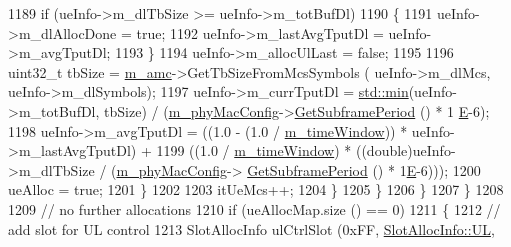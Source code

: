 \begin{DoxyCode}
1189                                                 \textcolor{keywordflow}{if} (ueInfo->m\_dlTbSize >= ueInfo->m\_totBufDl)
1190                                                 \{
1191                                                         ueInfo->m\_dlAllocDone = \textcolor{keyword}{true};
1192                                                         ueInfo->m\_lastAvgTputDl = ueInfo->m\_avgTputDl;
1193                                                 \}
1194                                                 ueInfo->m\_allocUlLast = \textcolor{keyword}{false};
1195 
1196                                                 uint32\_t tbSize = \hyperlink{classns3_1_1MmWaveFlexTtiMaxRateMacScheduler_a8a84d69426586fddd45abe7174da607d}{m\_amc}->GetTbSizeFromMcsSymbols (
      ueInfo->m\_dlMcs, ueInfo->m\_dlSymbols);
1197                                                 ueInfo->m\_currTputDl = \hyperlink{80211b_8c_ac6afabdc09a49a433ee19d8a9486056d}{std::min}(ueInfo->m\_totBufDl,
      tbSize) / (\hyperlink{classns3_1_1MmWaveMacScheduler_a24d7af4971d2e500fe543cefbafa2fd9}{m\_phyMacConfig}->\hyperlink{classns3_1_1MmWavePhyMacCommon_a1d402260d29c8931dd3dde73b295e23d}{GetSubframePeriod} () * 1
      \hyperlink{packet-test-suite_8cc_a171669980e29849aa5e3722d573181ee}{E}-6);
1198                                                 ueInfo->m\_avgTputDl = ((1.0 - (1.0 / 
      \hyperlink{classns3_1_1MmWaveFlexTtiMaxRateMacScheduler_aaa92d0980a88e04f7c5905cbed748264}{m\_timeWindow})) * ueInfo->m\_lastAvgTputDl) +
1199                                                                 ((1.0 / 
      \hyperlink{classns3_1_1MmWaveFlexTtiMaxRateMacScheduler_aaa92d0980a88e04f7c5905cbed748264}{m\_timeWindow}) * ((double)ueInfo->m\_dlTbSize / (\hyperlink{classns3_1_1MmWaveMacScheduler_a24d7af4971d2e500fe543cefbafa2fd9}{m\_phyMacConfig}->
      \hyperlink{classns3_1_1MmWavePhyMacCommon_a1d402260d29c8931dd3dde73b295e23d}{GetSubframePeriod} () * 1\hyperlink{packet-test-suite_8cc_a171669980e29849aa5e3722d573181ee}{E}-6)));
1200                                                 ueAlloc = \textcolor{keyword}{true};
1201                                         \}
1202 
1203                                         itUeMcs++;
1204                                 \}
1205                         \}
1206                 \}
1207         \}
1208 
1209         \textcolor{comment}{// no further allocations}
1210         \textcolor{keywordflow}{if} (ueAllocMap.size () == 0)
1211         \{
1212                 \textcolor{comment}{// add slot for UL control}
1213                 SlotAllocInfo ulCtrlSlot (0xFF, \hyperlink{structns3_1_1SlotAllocInfo_a6cad60db1d39034f1851e2cea625fe5da916b5be54594ead6ed677c570311cad2}{SlotAllocInfo::UL}, 

\end{DoxyCode}
